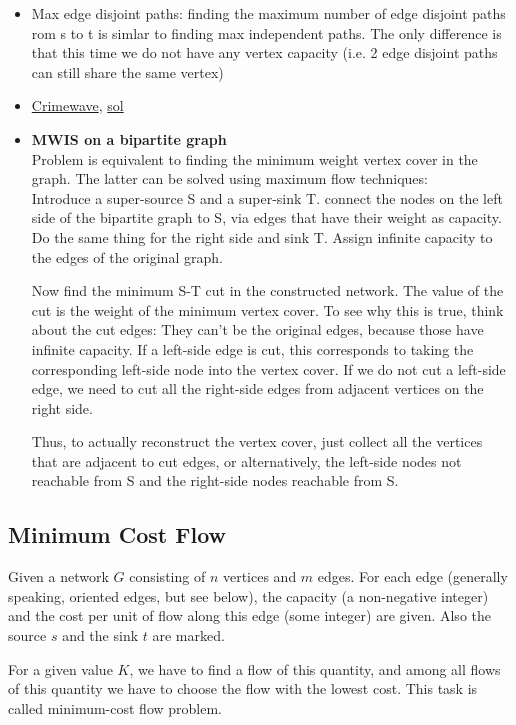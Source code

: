 \documentclass[8pt, a4paper, oneside, twocolumn]{extarticle}
\begin{document}
\begin{itemize}[leftmargin=*]
    \item Max edge disjoint paths: finding the maximum number of edge disjoint paths rom s to t is simlar to finding max independent paths. The only difference is that this time we do not have any vertex capacity (i.e. 2 edge disjoint paths can still share the same vertex)
    \item \href{https://uva.onlinejudge.org/external/5/563.pdf}{Crimewave}, \href{https://gist.github.com/sourabhxyz/d9125c7f5149f80b267514b66ec65d3b}{sol} 
    \item \textbf{MWIS on a bipartite graph}
    \\Problem is equivalent to finding the minimum weight vertex cover in the graph. The latter can be solved using maximum flow techniques:
    \\Introduce a super-source S and a super-sink T. connect the nodes on the left side of the bipartite graph to S, via edges that have their weight as capacity. Do the same thing for the right side and sink T. Assign infinite capacity to the edges of the original graph.

    Now find the minimum S-T cut in the constructed network. The value of the cut is the weight of the minimum vertex cover. To see why this is true, think about the cut edges: They can't be the original edges, because those have infinite capacity. If a left-side edge is cut, this corresponds to taking the corresponding left-side node into the vertex cover. If we do not cut a left-side edge, we need to cut all the right-side edges from adjacent vertices on the right side.

    Thus, to actually reconstruct the vertex cover, just collect all the vertices that are adjacent to cut edges, or alternatively, the left-side nodes not reachable from S and the right-side nodes reachable from S.
    

\end{itemize}
\subsection{Minimum Cost Flow}
Given a network $G$ consisting of $n$ vertices and $m$ edges. For each edge (generally speaking, oriented edges, but see below), the capacity (a non-negative integer) and the cost per unit of flow along this edge (some integer) are given. Also the source $s$ and the sink $t$ are marked.

For a given value $K$, we have to find a flow of this quantity, and among all flows of this quantity we have to choose the flow with the lowest cost. This task is called minimum-cost flow problem.
\end{document}
